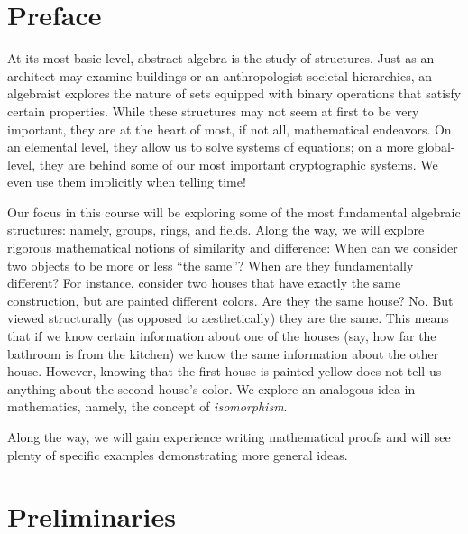 \documentclass[10pt,]{book}
\theoremstyle{plain}
\theoremstyle{definition}
\theoremstyle{definition}
\theoremstyle{definition}
\theoremstyle{definition}
\numberwithin{equation}{section}
\begin{document}
\chapter*{Preface}\label{preface-1}

    At its most basic level, abstract algebra is the study of structures. Just as an architect may examine buildings or an anthropologist societal hierarchies, an algebraist explores the nature of sets equipped with binary operations that satisfy certain properties. While these structures may not seem at first to be very important, they are at the heart of most, if not all, mathematical endeavors. On an elemental level, they allow us to solve systems of equations; on a more global-level, they are behind some of our most important cryptographic systems. We even use them implicitly when telling time!
\par

    Our focus in this course will be exploring some of the most fundamental algebraic structures: namely, groups, rings, and fields. Along the way, we will explore rigorous mathematical notions of similarity and difference: When can we consider two objects to be more or less ``the same''? When are they fundamentally different? For instance, consider two houses that have exactly the same construction, but are painted different colors. Are they the same house? No. But viewed structurally (as opposed to aesthetically) they are the same. This means that if we know certain information about one of the houses (say, how far the bathroom is from the kitchen) we know the same information about the other house. However, knowing that the first house is painted yellow does not tell us anything about the second house's color. We explore an analogous idea in mathematics, namely, the concept of \emph{isomorphism}.
\par

    Along the way, we will gain experience writing mathematical proofs and will see plenty of specific examples demonstrating more general ideas.
\setcounter{tocdepth}{1}
\renewcommand*\contentsname{Contents}
\tableofcontents
\mainmatter
\typeout{************************************************}
\typeout{************************************************}
\chapter[{Preliminaries}]{Preliminaries}\label{pre}
\typeout{************************************************}
\typeout{************************************************}
\end{document}

